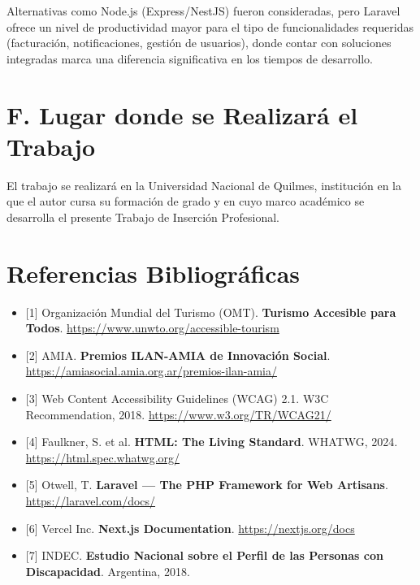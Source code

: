 \documentclass[12pt,a4paper]{article}
\begin{document}
Alternativas como Node.js (Express/NestJS) fueron consideradas, pero Laravel ofrece un
nivel de productividad mayor para el tipo de funcionalidades requeridas (facturación,
notificaciones, gestión de usuarios), donde contar con soluciones integradas marca una
diferencia significativa en los tiempos de desarrollo.

\section*{F. Lugar donde se Realizará el Trabajo}

El trabajo se realizará en la Universidad Nacional de Quilmes, institución en la que el autor cursa
su formación de grado y en cuyo marco académico se desarrolla el presente Trabajo de Inserción
Profesional.

\section*{Referencias Bibliográficas}

\begin{itemize}[leftmargin=0pt, label={}, itemsep=4pt]
  \item {[1]} Organización Mundial del Turismo (OMT). \textbf{Turismo Accesible para Todos}.
        \url{https://www.unwto.org/accessible-tourism}

  \item {[2]} AMIA. \textbf{Premios ILAN-AMIA de Innovación Social}.
        \url{https://amiasocial.amia.org.ar/premios-ilan-amia/}

  \item {[3]} Web Content Accessibility Guidelines (WCAG) 2.1.
        W3C Recommendation, 2018.
        \url{https://www.w3.org/TR/WCAG21/}

  \item {[4]} Faulkner, S. et al. \textbf{HTML: The Living Standard}.
        WHATWG, 2024. \url{https://html.spec.whatwg.org/}

  \item {[5]} Otwell, T. \textbf{Laravel — The PHP Framework for Web Artisans}.
        \url{https://laravel.com/docs/}

  \item {[6]} Vercel Inc. \textbf{Next.js Documentation}.
        \url{https://nextjs.org/docs}

  \item {[7]} INDEC. \textbf{Estudio Nacional sobre el Perfil de las Personas con Discapacidad}.
        Argentina, 2018.
\end{itemize}
\end{document}
